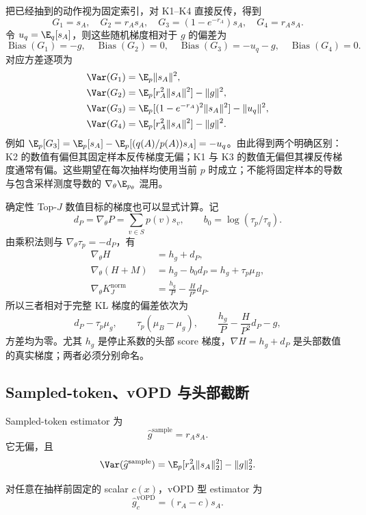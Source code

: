 把已经抽到的动作视为固定索引，对 K1--K4 直接反传，得到
\[
 G_1=s_A,\quad G_2=r_As_A,\quad
 G_3=(1-e^{-r_A})s_A,\quad G_4=r_As_A.
\]
令 $u_q=\E_q[s_A]$，则这些随机梯度相对于 $g$ 的偏差为
\[
 \operatorname{Bias}(G_1)=-g,\quad
 \operatorname{Bias}(G_2)=0,\quad
 \operatorname{Bias}(G_3)=-u_q-g,\quad
 \operatorname{Bias}(G_4)=0.
\]
对应方差逐项为
\begin{align*}
 \Var(G_1)&=\E_p\lVert s_A\rVert^2,\\
 \Var(G_2)&=\E_p[r_A^2\lVert s_A\rVert^2]-\lVert g\rVert^2,\\
 \Var(G_3)&=\E_p[(1-e^{-r_A})^2\lVert s_A\rVert^2]-\lVert u_q\rVert^2,\\
 \Var(G_4)&=\E_p[r_A^2\lVert s_A\rVert^2]-\lVert g\rVert^2.
\end{align*}
例如 $\E_p[G_3]=\E_p[s_A]-\E_p[(q(A)/p(A))s_A]=-u_q$。由此得到两个明确区别：K2 的数值有偏但其固定样本反传梯度无偏；K1 与 K3 的数值无偏但其裸反传梯度通常有偏。这些期望在每次抽样均使用当前 $p$ 时成立；不能将固定样本的导数与包含采样测度导数的 $\nabla_\theta\E_{p_\theta}$ 混用。

确定性 Top-$J$ 数值目标的梯度也可以显式计算。记
\[
 d_P=\nabla_\theta P=\sum_{v\in S}p(v)s_v,
 \qquad b_0=\log(\tau_p/\tau_q).
\]
由乘积法则与 $\nabla_\theta\tau_p=-d_P$，有
\begin{align*}
 \nabla_\theta H&=h_g+d_P,\\
 \nabla_\theta(H+M)&=h_g-b_0d_P=h_g+\tau_p\mu_B,\\
 \nabla_\theta K_J^{\mathrm{norm}}
 &=\frac{h_g}{P}-\frac{H}{P^2}d_P.
\end{align*}
所以三者相对于完整 KL 梯度的偏差依次为
\[
 d_P-\tau_p\mu_g,\qquad
 \tau_p(\mu_B-\mu_g),\qquad
 \frac{h_g}{P}-\frac{H}{P^2}d_P-g,
\]
方差均为零。尤其 $h_g$ 是停止系数的头部 score 梯度，$\nabla H=h_g+d_P$ 是头部数值的真实梯度；两者必须分别命名。

\subsection{Sampled-token、vOPD 与头部截断}

Sampled-token estimator 为
\[
 \widehat g^{\mathrm{sample}}=r_As_A.
\]
它无偏，且
\begin{equation}
 \Var(\widehat g^{\mathrm{sample}})
 =\E_p[r_A^2\lVert s_A\rVert_2^2]-\lVert g\rVert_2^2.
 \label{eq:chapter3-sample-grad-var}
\end{equation}

对任意在抽样前固定的 scalar $c(x)$，vOPD 型 estimator 为
\begin{equation}
 \widehat g^{\mathrm{vOPD}}_c=(r_A-c)s_A.
 \label{eq:chapter3-vopd}
\end{equation}

